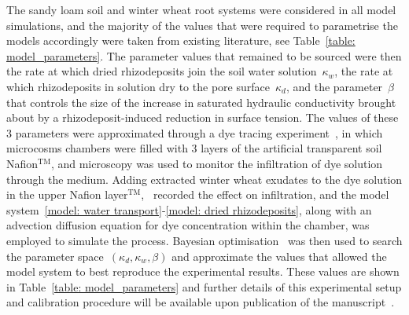 \documentclass[11pt,a4paper]{article}
\numberwithin{equation}{section}
\begin{document}
The sandy loam soil and winter wheat root systems were considered in all model simulations, and the majority of the values that were required to parametrise the models accordingly were taken from existing literature, see Table~\ref{table: model_parameters}. The parameter values that remained to be sourced were then the rate at which dried rhizodeposits join the soil water solution~$\kappa_w$, the rate at which rhizodeposits in solution dry to the pore surface~$\kappa_d$, and the parameter~$\beta$ that controls the size of the increase in saturated hydraulic conductivity brought about by a rhizodeposit-induced reduction in surface tension. The values of these 3 parameters were approximated through a dye tracing experiment~\citep{liu2024microcosm}, in which microcosms chambers were filled with 3 layers of the artificial transparent soil Nafion$^{\text{TM}}$, and microscopy was used to monitor the infiltration of dye solution through the medium. Adding extracted winter wheat exudates to the dye solution in the upper Nafion layer$^{\text{TM}}$,~\citep{gomez2025exudates} recorded the effect on infiltration, and the model system~\eqref{model: water transport}-\eqref{model: dried rhizodeposits}, along with an advection diffusion equation for dye concentration within the chamber, was employed to simulate the process. Bayesian optimisation~\citep{brochu2010tutorial} was then used to search the parameter space~$(\kappa_d,\kappa_w, \beta)$ and approximate the values that allowed the model system to best reproduce the experimental results. These values are shown in Table~\ref{table: model_parameters} and further details of this experimental setup and calibration procedure will be available upon publication of the manuscript~\citep{gomez2025exudates}.    
\end{document}
